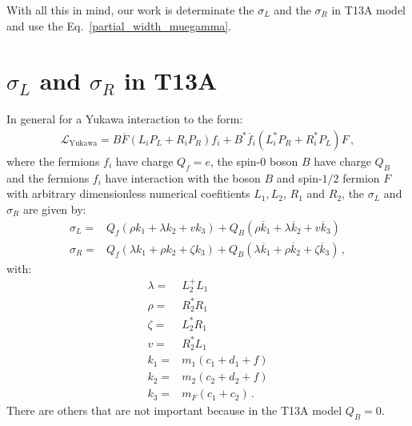 With all this in mind, our work is determinate the $\sigma_L$ and the $\sigma_R$ in T13A model and use the Eq.~\eqref{partial_width_muegamma}.

\section{$\sigma_L$ and $\sigma_R$ in T13A}

In general for a Yukawa interaction to the form:
\begin{align}
\label{eq:general-yukawa-lagrangian}
\mathcal{L}_{\text{Yukawa}}=B\overline{F}(L_iP_L+R_iP_R)f_i+B^*\overline{f}_i(L_i^*P_R+R_i^*P_L)F\,,
\end{align}
where the fermions $f_i$ have charge $Q_f=e$, the spin-$0$ boson $B$ have charge $Q_B$ and the fermions $f_i$ have interaction with the boson $B$ and spin-$1/2$ fermion $F$ with arbitrary dimensionless numerical coefitients $L_1,L_2$, $R_1$ and $R_2$, the $\sigma_L$ and $\sigma_R$ are given by:
\begin{align}
\sigma_L=& Q_f(\rho k_1 +\lambda k_2 + v k_3)+Q_B(\rho \overline{k}_1 + \lambda \overline{k}_2 + v \overline{k}_3)\\
\sigma_R=& Q_f(\lambda k_1 +\rho k_2 + \zeta k_3)+Q_B(\lambda \overline{k}_1 + \rho \overline{k}_2 + \zeta \overline{k}_3)\,,
\end{align} 
with:
\begin{align}
\lambda=&L_2^+L_1\\
\rho=&R_2^*R_1\\
\zeta=&L_2^*R_1\\
v=&R_2^*L_1\\
k_1=&m_1(c_1+d_1+f)\\
k_2=&m_2(c_2+d_2+f)\\
k_3=&m_F(c_1+c_2)\,.
\end{align}
There are others that are not important because in the T13A model $Q_B=0$.

